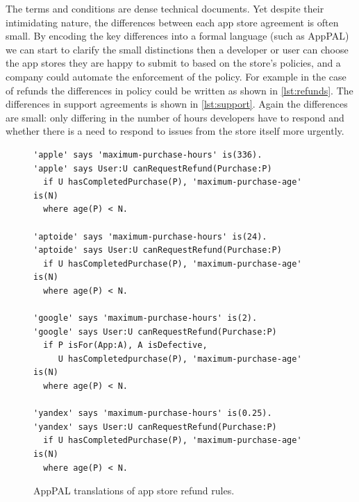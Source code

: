 \documentclass[thesis.tex]{subfiles}
\begin{document}
The terms and conditions are dense technical documents. Yet despite their
intimidating nature, the differences between each app store agreement is often
small. By encoding the key differences into a formal language (such as AppPAL)
we can start to clarify the small distinctions then a developer or user can
choose the app stores they are happy to submit to based on the store's policies,
and a company could automate the enforcement of the policy. For example in the
case of refunds the differences in policy could be written as shown in
\autoref{lst:refunds}. The differences in support agreements is shown in
\autoref{lst:support}. Again the differences are small: only differing in the
number of hours developers have to respond and whether there is a need to
respond to issues from the store itself more urgently.

\begin{figure}\centering
\begin{lstlisting}
'apple' says 'maximum-purchase-hours' is(336).
'apple' says User:U canRequestRefund(Purchase:P)
  if U hasCompletedPurchase(P), 'maximum-purchase-age' is(N)
  where age(P) < N.

'aptoide' says 'maximum-purchase-hours' is(24).
'aptoide' says User:U canRequestRefund(Purchase:P)
  if U hasCompletedPurchase(P), 'maximum-purchase-age' is(N)
  where age(P) < N.

'google' says 'maximum-purchase-hours' is(2).
'google' says User:U canRequestRefund(Purchase:P)
  if P isFor(App:A), A isDefective,
     U hasCompletedpurchase(P), 'maximum-purchase-age' is(N)
  where age(P) < N.

'yandex' says 'maximum-purchase-hours' is(0.25).
'yandex' says User:U canRequestRefund(Purchase:P)
  if U hasCompletedPurchase(P), 'maximum-purchase-age' is(N)
  where age(P) < N.
\end{lstlisting}
\caption{AppPAL translations of app store refund rules.}
\label{lst:refunds}
\end{figure}
\end{document}
